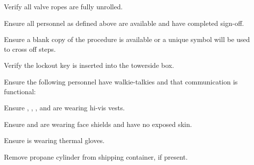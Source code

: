 \begin{checklist}
\begin{checklist}
        \item Verify all valve ropes are fully unrolled. 
        \item Ensure all personnel as defined above are available and have completed sign-off.
        \item Ensure a blank copy of the procedure is available or a unique symbol will be used to cross off steps. 
        \item Verify the lockout key is inserted into the towerside box.
        \item Ensure the following personnel have walkie-talkies and that communication is functional:
        \begin{checklist}
            \item \ops{}
            \item \secondary{}
            \item \peri{}
            \item \perii{}
            \item \periii{}
            \item \periv{}
    \end{checklist}
    \item Ensure \peri{}, \perii{}, \periii{}, and \periv{} are wearing hi-vis vests.
    \item Ensure \primary{} and \secondary{} are wearing face shields and have no exposed skin.
    \item Ensure \primary{} is wearing thermal gloves.
    \item Remove propane cylinder from shipping container, if present.
    \end{checklist}
    
\end{checklist}
\setcounter{checklistnum}{0}

